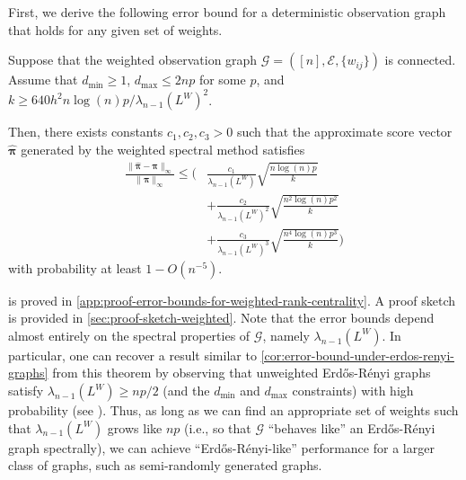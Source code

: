 \documentclass[sigconf,nonacm,pbalance]{acmart}
\begin{document}
First, we derive the following error bound for a deterministic observation graph that holds for any given set of weights.
\begin{theorem}\label{thm:error-bounds-for-weighted-rank-centrality}
Suppose that the weighted observation graph $\mathcal{G}=([n], \mathcal{E}, \{w_{ij}\})$ is connected. Assume that $d_\text{min} \geq 1$, $d_\text{max} \leq 2np$ for some $p$, and $k \geq 640 h^2 n \log(n) p / \lambda_{n-1}(L^W)^2$.

Then, there exists constants $c_1,c_2,c_3>0$ such that the approximate score vector $\hat{\bm{\pi}}$ generated by the weighted spectral method satisfies
\begin{align}
    \frac{\|\hat{\bm{\pi}}-\bm{\pi}\|_\infty}{\|\bm{\pi}\|_\infty} \leq \Biggl(&\frac{c_1}{\lambda_{n-1}(L^W)} \sqrt{\frac{n \log(n) p}{k}} \\
    &+\frac{c_2}{\lambda_{n-1}(L^W)^2}\sqrt{\frac{n^2\log(n) p^2}{k}} \\
    &+\frac{c_3}{\lambda_{n-1}(L^W)^3}\sqrt{\frac{n^4\log(n) p^3}{k}} \Biggr)
\end{align}
with probability at least $1-O(n^{-5})$.
\end{theorem}
 is proved in \cref{app:proof-error-bounds-for-weighted-rank-centrality}. A proof sketch is provided in \cref{sec:proof-sketch-weighted}. Note that the error bounds depend almost entirely on the spectral properties of $\mathcal{G}$, namely $\lambda_{n-1}(L^W)$. In particular, one can recover a result similar to \cref{cor:error-bound-under-erdos-renyi-graphs} from this theorem by observing that unweighted Erd\H{o}s-R\'{e}nyi graphs satisfy $\lambda_{n-1}(L^W) \geq np/2$ (and the $d_\text{min}$ and $d_\text{max}$ constraints) with high probability (see \cite[Lemma 10]{MonotoneAdversary}). Thus, as long as we can find an appropriate set of weights such that $\lambda_{n-1}(L^W)$ grows like $np$ (i.e., so that $\mathcal{G}$ ``behaves like'' an Erd\H{o}s-R\'{e}nyi graph spectrally), we can achieve ``Erd\H{o}s-R\'{e}nyi-like'' performance for a larger class of graphs, such as semi-randomly generated graphs.
\end{document}
